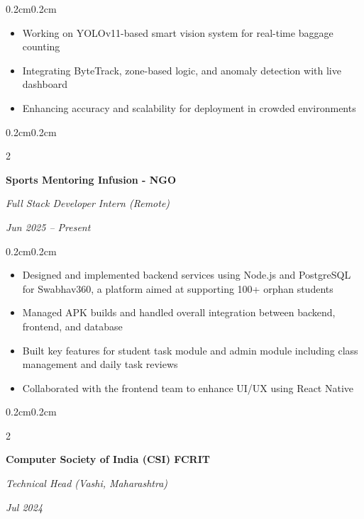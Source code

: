 \documentclass[10pt, letterpaper]{article}
\newenvironment{highlights}{
    \begin{itemize}[
        topsep=0.10cm,
        parsep=0.10cm,
        partopsep=0pt,
        itemsep=0pt,
        leftmargin=0.4cm + 10pt
    ]
}{\end{itemize}}
\newenvironment{onecolentry}{
    \begin{adjustwidth}{0.2cm}{0.2cm}
}{\end{adjustwidth}}
\newenvironment{twocolentry}[2][]{
    \onecolentry
    \def\secondColumn{#2}
    \setcolumnwidth{\fill, 4.5cm}
    \begin{paracol}{2}
}{
    \switchcolumn \raggedleft \secondColumn
    \end{paracol}
    \endonecolentry
}
\begin{document}
    \vspace{0.10 cm}
    \begin{onecolentry}
        \begin{highlights}
            \item Working on YOLOv11-based smart vision system for real-time baggage counting
            \item Integrating ByteTrack, zone-based logic, and anomaly detection with live dashboard
            \item Enhancing accuracy and scalability for deployment in crowded environments
        \end{highlights}
    \end{onecolentry}

    \vspace{0.2 cm}

    \begin{twocolentry}{
        \textit{Jun 2025 -- Present}
    }
        \textbf{Sports Mentoring Infusion - NGO}
        
        \textit{Full Stack Developer Intern (Remote)}
    \end{twocolentry}
    
    \vspace{0.10 cm}
    \begin{onecolentry}
        \begin{highlights}
            \item Designed and implemented backend services using Node.js and PostgreSQL for Swabhav360, a platform aimed at supporting 100+ orphan students
            \item Managed APK builds and handled overall integration between backend, frontend, and database
            \item Built key features for student task module and admin module including class management and daily task reviews
            \item Collaborated with the frontend team to enhance UI/UX using React Native
        \end{highlights}
    \end{onecolentry}

    \vspace{0.2 cm}

    \begin{twocolentry}{
        \textit{Jul 2024}
    }
        \textbf{Computer Society of India (CSI) FCRIT}
        
        \textit{Technical Head (Vashi, Maharashtra)}
    \end{twocolentry}
    
\end{document}
